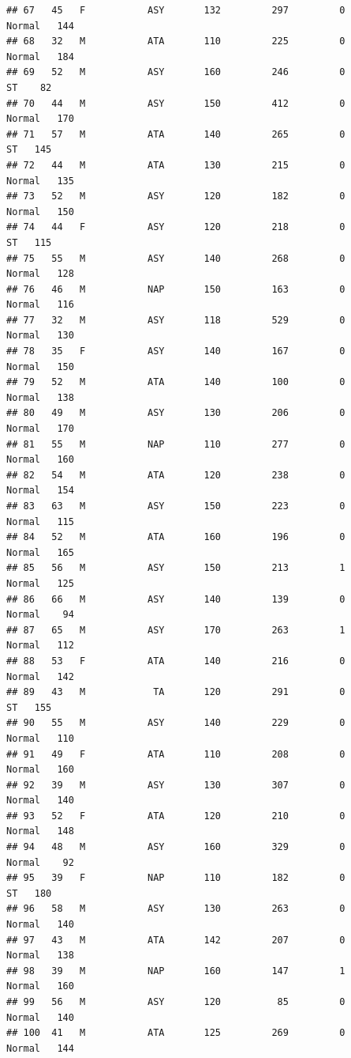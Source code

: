\documentclass[
]{article}
\begin{document}
\begin{verbatim}
## 67   45   F           ASY       132         297         0     Normal   144
## 68   32   M           ATA       110         225         0     Normal   184
## 69   52   M           ASY       160         246         0         ST    82
## 70   44   M           ASY       150         412         0     Normal   170
## 71   57   M           ATA       140         265         0         ST   145
## 72   44   M           ATA       130         215         0     Normal   135
## 73   52   M           ASY       120         182         0     Normal   150
## 74   44   F           ASY       120         218         0         ST   115
## 75   55   M           ASY       140         268         0     Normal   128
## 76   46   M           NAP       150         163         0     Normal   116
## 77   32   M           ASY       118         529         0     Normal   130
## 78   35   F           ASY       140         167         0     Normal   150
## 79   52   M           ATA       140         100         0     Normal   138
## 80   49   M           ASY       130         206         0     Normal   170
## 81   55   M           NAP       110         277         0     Normal   160
## 82   54   M           ATA       120         238         0     Normal   154
## 83   63   M           ASY       150         223         0     Normal   115
## 84   52   M           ATA       160         196         0     Normal   165
## 85   56   M           ASY       150         213         1     Normal   125
## 86   66   M           ASY       140         139         0     Normal    94
## 87   65   M           ASY       170         263         1     Normal   112
## 88   53   F           ATA       140         216         0     Normal   142
## 89   43   M            TA       120         291         0         ST   155
## 90   55   M           ASY       140         229         0     Normal   110
## 91   49   F           ATA       110         208         0     Normal   160
## 92   39   M           ASY       130         307         0     Normal   140
## 93   52   F           ATA       120         210         0     Normal   148
## 94   48   M           ASY       160         329         0     Normal    92
## 95   39   F           NAP       110         182         0         ST   180
## 96   58   M           ASY       130         263         0     Normal   140
## 97   43   M           ATA       142         207         0     Normal   138
## 98   39   M           NAP       160         147         1     Normal   160
## 99   56   M           ASY       120          85         0     Normal   140
## 100  41   M           ATA       125         269         0     Normal   144

\end{verbatim}
\end{document}
